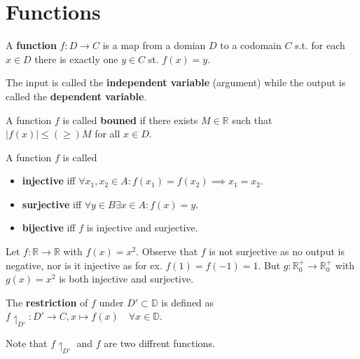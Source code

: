 \section{Functions}

\begin{definition}
    A \textbf{function} $f: D \to C$ is a map from a domian $D$ to a codomain $C$ s.t. for each $x \in D$ there is exactly one $y \in C$ st. $f(x) = y$.
\end{definition}

\begin{remark}
    The input is called the \textbf{independent variable} (argument) while the output is called the \textbf{dependent variable}.
\end{remark}

\begin{definition}
    A function $f$ is called \textbf{bouned} if there exists $M \in \mathbb{R}$ such that $|f(x)| \leq(\geq) M$ for all $x \in D$.
\end{definition}

\begin{definition}
    A function $f$ is called
    \begin{itemize}
        \item \textbf{injective} iff $\forall x_1, x_2 \in A : f(x_1) = f(x_2) \implies x_1 = x_2$.
        \item \textbf{surjective} iff $\forall y \in B \exists x \in A : f(x) = y$.
        \item \textbf{bijective} iff $f$ is injective and surjective.
    \end{itemize}
\end{definition}

\begin{example}
    Let $f: \mathbb{R} \to \mathbb{R}$ with $f(x) = x^2$. Observe that $f$ is not surjective as no output is negative, nor is it injective as for ex. $f(1) = f(-1) = 1$. But $g: \mathbb{R}_{0}^+ \to \mathbb{R}_{0}^+$ with $g(x) = x^2$ is both injective and surjective.
\end{example}

\begin{definition}
    The \textbf{restriction} of $f$ under $D' \subset \mathbb{D}$ is defined as $f\upharpoonleft_{D'}: D' \to C, x \mapsto f(x) \quad \forall x \in \mathbb{D}$.
\end{definition}

\begin{remark}
    Note that $f\upharpoonleft_{D'}$ and $f$ are two diffrent functions.
\end{remark}

